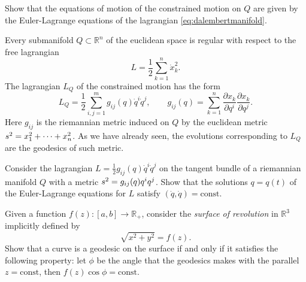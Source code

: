 \documentclass[english,fontsize=11pt,paper=a5,oneside]{scrbook}
\newcommand{\R}{\mathbb{R}}
\let\d\relax
\DeclareMathOperator{\d}{d}
\theoremstyle{definition}
\newenvironment{example}
  {\pushQED{\qed}\renewcommand{\qedsymbol}{$\lozenge$}\examplex}
  {\popQED\endexamplex}
\newenvironment{exercise}
  {\pushQED{\qed}\renewcommand{\qedsymbol}{$\maltese$}\exercisex}
  {\popQED\endexercisex}
\begin{document}
\begin{exercise}
    Show that the equations of motion of the constrained motion on $Q$ are given by the Euler-Lagrange equations of the lagrangian \eqref{eq:dalembertmanifold}.
\end{exercise}

\begin{example}
    Every submanifold $Q\subset \R^n$ of the euclidean space is regular with respect to the free lagrangian
    \begin{equation}
        L = \frac12 \sum_{k=1}^n \dot x^2_k.
    \end{equation}
    The lagrangian $L_Q$ of the constrained motion has the form
    \begin{equation}
        L_Q = \frac12 \sum_{i,j=1}^m g_{ij}(q)\dot q^i\dot q^j, \qquad g_{ij}(q) = \sum_{k=1}^n \frac{\partial x_k}{\partial q^i}\frac{\partial x_k}{\partial q^j}.
    \end{equation}
    Here $g_{ij}$ is the riemannian metric induced on $Q$ by the euclidean metric $\d s^2 = \d x_1^2 + \cdots + \d x_n^2$.
    As we have already seen, the evolutions corresponding to $L_Q$ are the geodesics of such metric.
\end{example}

\begin{exercise}
    Consider the lagrangian $L=\frac12 g_{ij}(q)\dot q^i \dot q^j$ on the tangent bundle of a riemannian manifold $Q$ with a metric $\d s^2 = g_{ij}(q)\d q^i \d q^j$.
    Show that the solutions $q=q(t)$ of the Euler-Lagrange equations for $L$ satisfy $(\dot q, \dot q)= \mathrm{const}$.
\end{exercise}

\begin{exercise}[Clairaut's relation]
    Given a function $f(z): [a,b] \to \R_+$, consider the \emph{surface of revolution} in $\R^3$ implicitly defined by
    \begin{equation}
        \sqrt{x^2 + y^2} = f(z).
    \end{equation}
    Show that a curve is a geodesic on the surface if and only if it satisfies the following property: let $\phi$ be the angle that the geodesics makes with the parallel $z=\mathrm{const}$, then $f(z)\cos \phi = \mathrm{const}$.
\end{exercise}
\end{document}
